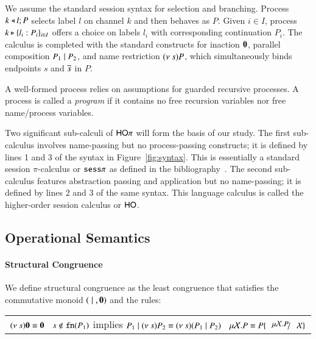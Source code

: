 We assume the standard session syntax for selection and branching. Process
$k \triangleleft l ; P$ selects label $l$ on channel $k$ and then behaves as $P$. 
Given $i \in I$, 
process 
$k \triangleright \{l_i:P_i\}_{i \in I}$ offers a choice on labels $l_i$ with
corresponding continuation $P_i$.
The calculus is completed with the standard constructs for 
inaction $\mathbf{0}$, 
parallel composition $P_1 \;|\; P_2$, and 
name restriction $(\nu\ s) P$, which simultaneously binds endpoints $s$ and $\overline{s}$ in $P$.


A well-formed process relies on assumptions for guarded recursive processes.
A process is called a \emph{program} if it contains 
no free recursion variables nor free name/process variables.



Two significant sub-calculi of $\mathsf{HO}\pi$ will form the basis of our study.
The first sub-calculus involves name-passing but no process-passing constructs; it is 
defined by lines 1 and 3 of the syntax in Figure~\ref{fig:syntax}.
This is essentially a standard session $\pi$-calculus 
or $\mathtt{sess}\pi$ as defined in the bibliography~\cite{}.
The second sub-calculus features abstraction passing and application but no name-passing; 
it is defined by lines 2 and 3 of the same syntax. This language 
calculus is called the higher-order session calculus or $\mathsf{HO}$.

\subsection{Operational Semantics}

\paragraph{Structural Congruence}

We define structural congruence as the least congruence that satisfies the commutative monoid $(\;|\;, \mathbf{0})$
and the rules:

\begin{tabular}{c}
	$(\nu\ s) \mathbf{0} \equiv \mathbf{0} \quad
	s \notin \mathtt{fn}(P_1)$ implies $P_1 \Par \news{s} P_2 \scong \news{s}(P_1 \Par P_2)
	\quad \rec{X}{P} \scong P\subst{\rec{X}{P}}{\rvar{X}}$
\end{tabular}


